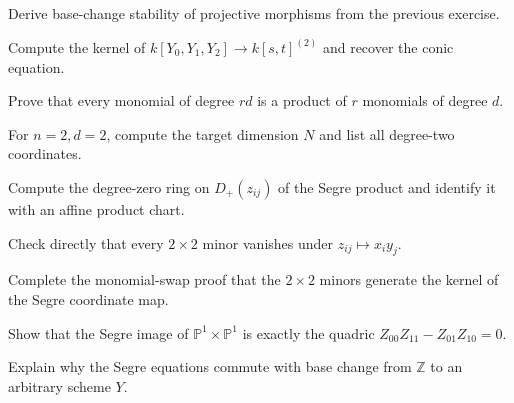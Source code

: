 \begin{exercise}\label{exr:vi38-10}
Derive base-change stability of projective morphisms from the previous exercise.
\end{exercise}

\begin{exercise}\label{exr:vi38-11}
Compute the kernel of \(k[Y_0,Y_1,Y_2]\to k[s,t]^{(2)}\) and recover the conic equation.
\end{exercise}

\begin{exercise}\label{exr:vi38-12}
Prove that every monomial of degree \(rd\) is a product of \(r\) monomials of degree \(d\).
\end{exercise}

\begin{exercise}\label{exr:vi38-13}
For \(n=2,d=2\), compute the target dimension \(N\) and list all degree-two coordinates.
\end{exercise}

\begin{exercise}\label{exr:vi38-14}
Compute the degree-zero ring on \(D_+(z_{ij})\) of the Segre product and identify it with an affine product chart.
\end{exercise}

\begin{exercise}\label{exr:vi38-15}
Check directly that every \(2\times2\) minor vanishes under \(z_{ij}\mapsto x_i y_j\).
\end{exercise}

\begin{exercise}\label{exr:vi38-16}
Complete the monomial-swap proof that the \(2\times2\) minors generate the kernel of the Segre coordinate map.
\end{exercise}

\begin{exercise}\label{exr:vi38-17}
Show that the Segre image of \(\mathbb P^1\times\mathbb P^1\) is exactly the quadric \(Z_{00}Z_{11}-Z_{01}Z_{10}=0\).
\end{exercise}

\begin{exercise}\label{exr:vi38-18}
Explain why the Segre equations commute with base change from \(\mathbb Z\) to an arbitrary scheme \(Y\).
\end{exercise}

